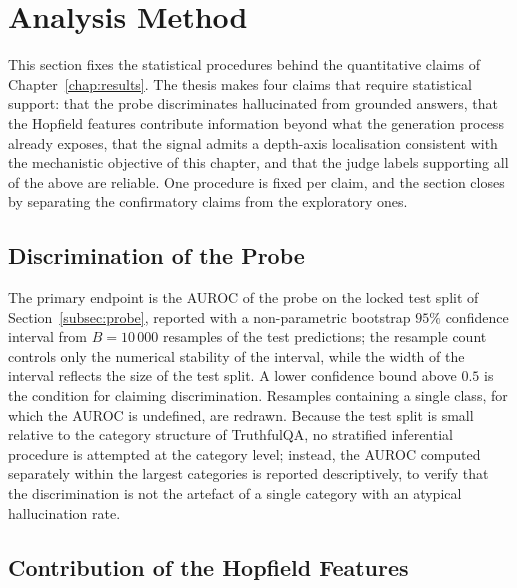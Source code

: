 \section{Analysis Method}
\label{sec:analysis_method}

This section fixes the statistical procedures behind the quantitative
claims of Chapter~\ref{chap:results}. The thesis makes four claims that
require statistical support: that the probe discriminates hallucinated from
grounded answers, that the Hopfield features contribute information beyond
what the generation process already exposes, that the signal admits a
depth-axis localisation consistent with the mechanistic objective of this
chapter, and that the judge labels supporting all of the above are
reliable. One procedure is fixed per claim, and the section closes by
separating the confirmatory claims from the exploratory ones.

\subsection{Discrimination of the Probe}
\label{subsec:an_discrimination}

The primary endpoint is the AUROC of the probe on the locked test split of
Section~\ref{subsec:probe}, reported with a non-parametric bootstrap $95\%$
confidence interval from $B = 10\,000$ resamples of the test predictions;
the resample count controls only the numerical stability of the interval,
while the width of the interval reflects the size of the test split. A
lower confidence bound above $0.5$ is the condition for claiming
discrimination. Resamples containing a single class, for which the AUROC is
undefined, are redrawn. Because the test split is small relative to the category
structure of TruthfulQA, no stratified inferential procedure is attempted
at the category level; instead, the AUROC computed separately within the
largest categories is reported descriptively, to verify that the
discrimination is not the artefact of a single category with an atypical
hallucination rate.

\subsection{Contribution of the Hopfield Features}
\label{subsec:an_contribution}

